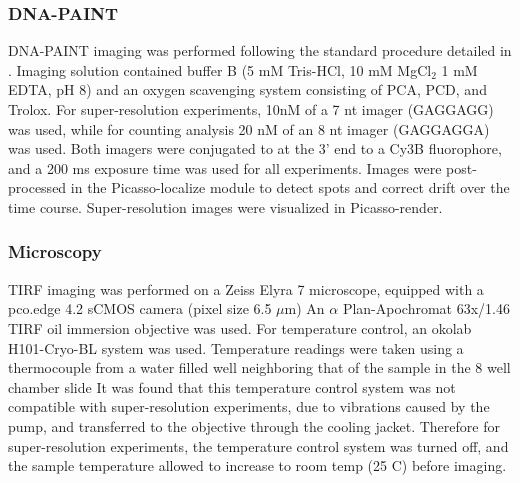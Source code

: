 \subsubsection{DNA-PAINT}
DNA-PAINT imaging was performed following the standard procedure detailed in \cite{schnitzbauer_2017}. 
  Imaging solution contained buffer B (5 mM Tris-HCl, 10 mM MgCl$_2$ 1 mM EDTA, pH 8) and an oxygen scavenging system consisting of PCA, PCD, and Trolox.
  For super-resolution experiments, 10nM of a 7 nt imager (GAGGAGG) was used, while for \ours counting analysis 
  20 nM of an 8 nt imager (GAGGAGGA) was used.
  Both imagers were conjugated to at the 3' end to a Cy3B fluorophore, and a 200 ms exposure time was used for all experiments.
  Images were post-processed in the Picasso-localize module to detect spots and correct drift over the time course. 
  Super-resolution images were visualized in Picasso-render.

\subsubsection{Microscopy}
TIRF imaging was performed on a Zeiss Elyra 7 microscope, equipped with a pco.edge 4.2 sCMOS camera (pixel size 6.5 $\mu$m)
  An $\alpha$ Plan-Apochromat 63x/1.46 TIRF oil immersion objective was used.
  For temperature control, an okolab H101-Cryo-BL system was used. Temperature readings were taken using a thermocouple from a water filled well neighboring 
  that of the sample in the 8 well chamber slide 
  It was found that this temperature control system was not compatible with super-resolution experiments, 
  due to vibrations caused by the pump, and transferred to the objective through the cooling jacket.
  Therefore for super-resolution experiments, the temperature control system was turned off, 
  and the sample temperature allowed to increase to room temp (25 C) before imaging.


